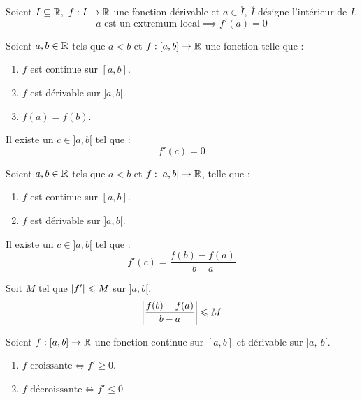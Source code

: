 \begin{theorem}
	Soient $I \subseteq \mathbb{R},\ f : I \to \mathbb{R}$ une fonction dérivable et $a \in \overset{\circ}{I}$, $\overset{\circ}{I}$ désigne l'intérieur de $I$. 
	\[ a \text{ est un extremum local} \implies f'(a) = 0 \]
\end{theorem}

\begin{theorem}
    Soient $a, b \in \mathbb{R}$ tels que $a < b$ et $f : [a, b] \to \mathbb{R}$ une fonction telle que :
    \begin{enumerate}
            \item $f$ est continue sur $[a, b]$.
            \item $f$ est dérivable sur $]a, b[$.
            \item $f(a) = f(b)$.
        \end{enumerate}
    \par \noindent Il existe un $c \in ]a, b[$ tel que : \[ f'(c) = 0 \]
\end{theorem}

\begin{theorem}
    Soient $a, b \in \mathbb{R}$ tels que $a < b$ et $f : [a, b] \to \mathbb{R}$, telle que : 
    \begin{enumerate}
            \item $f$ est continue sur $[a, b]$.
            \item $f$ est dérivable sur $]a, b[$.
        \end{enumerate}
    \par \noindent Il existe un $c \in ]a, b[$ tel que :
	\[ f'(c) = \frac{f(b) - f(a)}{b - a} \]
\end{theorem}

\begin{corollary}
	Soit $M$ tel que $\abs{f'} \leqslant M$ sur $]a, b[$.
	\[ \abs{\frac{f(b) - f(a)}{b - a}} \leqslant M \]
\end{corollary}

\begin{proposition}
    Soient $f : [a, b] \to \mathbb{R}$ une fonction continue sur $[a, b]$ et dérivable sur $]a,\ b[$.
    \begin{enumerate}
            \item $f \text{ croissante} \iff f' \geq 0$.
            \item $f \text{ décroissante} \iff f' \leq 0$
        \end{enumerate}
\end{proposition}

